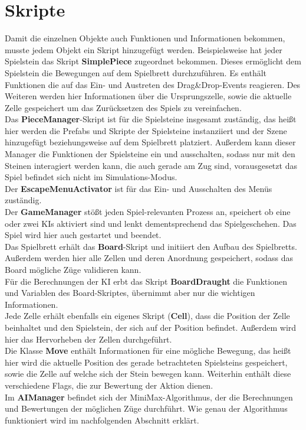 \section{Skripte}
\label{ch:Implementierung:sec:Skripte}
Damit die einzelnen Objekte auch Funktionen und Informationen bekommen, musste jedem Objekt ein Skript hinzugefügt werden.
Beispielsweise hat jeder Spielstein das Skript \textbf{SimplePiece} zugeordnet bekommen. Dieses ermöglicht dem Spielstein die Bewegungen auf dem Spielbrett durchzuführen. Es enthält Funktionen die auf das Ein- und Austreten des Drag\&Drop-Events reagieren. Des Weiteren werden hier Informationen über die Ursprungszelle, sowie die aktuelle Zelle gespeichert um das Zurücksetzen des Spiels zu vereinfachen. \\
Das \textbf{PieceManager}-Skript ist für die Spielsteine insgesamt zuständig, das heißt hier werden die Prefabs und Skripte der Spielsteine instanziiert und der Szene hinzugefügt beziehungsweise auf dem Spielbrett platziert. Außerdem kann dieser Manager die Funktionen der Spielsteine ein und ausschalten, sodass nur mit den Steinen interagiert werden kann, die auch gerade am Zug sind, vorausgesetzt das Spiel befindet sich nicht im Simulations-Modus.\\
Der \textbf{EscapeMenuActivator} ist für das Ein- und Ausschalten des Menüs zuständig.\\
Der \textbf{GameManager} stößt jeden Spiel-relevanten Prozess an, speichert ob eine oder zwei KIs aktiviert sind und lenkt dementsprechend das Spielgeschehen. Das Spiel wird hier auch gestartet und beendet.\\
Das Spielbrett erhält das \textbf{Board}-Skript und initiiert den Aufbau des Spielbretts. Außerdem werden hier alle Zellen und deren Anordnung gespeichert, sodass das Board mögliche Züge validieren kann.\\
Für die Berechnungen der KI erbt das Skript \textbf{BoardDraught} die Funktionen und Variablen des Board-Skriptes, übernimmt aber nur die wichtigen Informationen.\\
Jede Zelle erhält ebenfalls ein eigenes Skript (\textbf{Cell}), dass die Position der Zelle beinhaltet und den Spielstein, der sich auf der Position befindet. Außerdem wird hier das Hervorheben der Zellen durchgeführt.\\
Die Klasse \textbf{Move} enthält Informationen für eine mögliche Bewegung, das heißt hier wird die aktuelle Position des gerade betrachteten Spielsteins gespeichert, sowie die Zelle auf welche sich der Stein bewegen kann. Weiterhin enthält diese verschiedene Flags, die zur Bewertung der Aktion dienen.\\
Im \textbf{AIManager} befindet sich der MiniMax-Algorithmus, der die Berechnungen und Bewertungen der möglichen Züge durchführt. Wie genau der Algorithmus funktioniert wird im nachfolgenden Abschnitt erklärt.

